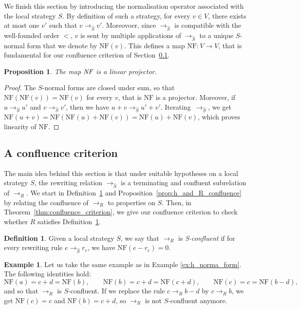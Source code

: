 \documentclass[10pt]{easychair}
\newtheorem{proposition}[theorem]{Proposition}
\theoremstyle{definition}
\newtheorem{definition}[theorem]{Definition}
\newtheorem{example}[theorem]{Example}
\newcommand\rewR{\to_R}
\newcommand\rewS{\to_{\hat{S}}}
\newcommand\NF{\text{NF}}
\newcommand\NFF{\emph{NF}}
\begin{document}
We finish this section by introducing the normalisation operator
associated with the local strategy $S$. By definition of such a
strategy, for every $v\in V$, there exists at most one $v'$ such that
$v\rewS v'$. Moreovoer, since $\rewS$ is compatible with the well-founded
order $<$, $v$ is sent by multiple applications of $\rewS$ to a unique
$S$-normal form that we denote by $\NF(v)$. This defines a map
$\NF:V\to V$, that is fundamental for our confluence criterion of
Section~\ref{sec:a_confluence_criterion}.

\begin{proposition}\label{prop:linearity_of_H}
  The map $\NFF$ is a linear projector.
\end{proposition}

\begin{proof}
  The $S$-normal forms are closed under sum, so that $\NF(\NF(v))=\NF(v)$
  for every $v$, that is $\NF$ is a projector. Moreover, if $u\rewS u'$
  and $v\rewS v'$, then we have $u+v\rewS u'+v'$. Iterating~$\rewS$, we
  get $\NF(u+v)=\NF(\NF(u)+\NF(v))=\NF(u)+\NF(v)$, which proves linearity
  of $\NF$.
\end{proof}

\subsection{A confluence criterion}
\label{sec:a_confluence_criterion}

The main idea behind this section is that under suitable hypotheses on a
local strategy $S$, the rewriting relation $\rewS$ is a terminating and
confluent subrelation of $\rewR$. We start in
Definition~\ref{def:standardisation_property} and
Proposition~\ref{prop:h_and_R_confluence} by relating the confluence of
$\rewR$ to properties on $S$. Then, in
Theorem~\ref{thm:confluence_criterion}, we give our confluence criterion
to check whether $R$ satisfies
Definition~\ref{def:standardisation_property}.

\begin{definition}\label{def:standardisation_property}
  Given a local strategy $S$, we say that $\rewR$ is \emph{S-confluent}
  if for every rewriting rule $e\rewS r_e$, we have $\NF(e-r_e)=0$.
\end{definition}
\smallskip

\begin{example}
  Let us take the same example as in Example \ref{ex:h_norma_form}. The
  following identities hold:
  \[\NF(a)=c+d=\NF(b),\qquad\NF(b)=c+d=\NF(c+d),\qquad\NF(c)=c=\NF(b-d),
  \]
  and so that $\rewR$ is $S$-confluent. If we replace the rule
  $c\rewR b-d$ by $c\rewR b$, we get $\NF(c)=c$ and $\NF(b)=c+d$, so
  $\rewR$ is not $S$-confluent anymore. 
\end{example}
\smallskip
\end{document}
